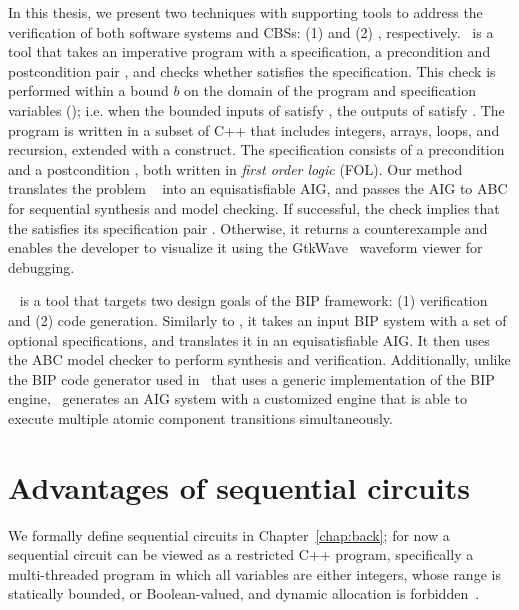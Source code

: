 In this thesis, we present two techniques with supporting tools 
to address the verification of both software systems and CBSs: 
(1) \mytool and (2) \biptool, respectively.
\mytool~is a tool that takes 
an imperative program \Pm with a specification,
a precondition and postcondition pair \pair{\Pre}{\Post},
and checks
whether \Pm satisfies the specification. This check 
is performed  within a 
bound $b$ on the domain of the program and specification
variables (\prob);
i.e. when the bounded inputs of \Pm satisfy \Pre, 
the outputs of \Pm satisfy \Post. 
The program is written in a subset of C++ that 
includes integers, arrays, loops, and recursion,
extended with a  construct.
The specification consists of a precondition \Pre and
a postcondition \Post, both written in 
{\em first order logic} (FOL). 
Our method translates the problem \prob~
into an equisatisfiable AIG,
and passes the AIG to ABC for
sequential synthesis and model checking. 
If successful, the check implies that the \Pm satisfies its 
specification pair \pair{\Pre}{\Post}. Otherwise, it returns a counterexample
and enables the developer to visualize it using the GtkWave~\cite{bybell2010gtkwave} waveform viewer for
debugging. 

\biptool~ is a tool that targets two design goals of the BIP framework:
(1) verification and (2) code generation. Similarly to \mytool, it takes an input 
BIP system with a set of optional specifications, 
and translates it in an equisatisfiable AIG. It then uses the ABC model checker 
to perform synthesis and verification. 
Additionally, unlike the BIP code generator used in~\cite{BasuBBCJNS11} that
uses a generic implementation of the BIP engine, 
\biptool~generates an AIG system with a customized engine that is able to 
execute multiple atomic component transitions simultaneously. 


\section{Advantages of sequential circuits}
\label{s:intro:advantages}
We formally define sequential circuits in
Chapter~\ref{chap:back}; for now a sequential
circuit can be viewed as a restricted C++ program,
specifically a multi-threaded program in which all
variables are either integers, whose range is statically
bounded, or Boolean-valued, and dynamic allocation is
forbidden~\cite{edwards2005challenges}.
%

